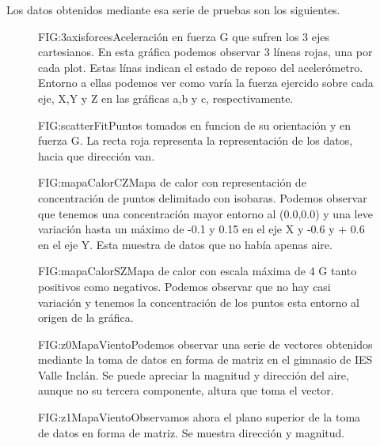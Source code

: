 
Los datos obtenidos mediante esa serie de pruebas son los siguientes.

\begin{figure}[Aceleraciones en 3 ejes.]{FIG:3axisforces}{Aceleración en fuerza G que sufren los 3 ejes cartesianos. En esta gráfica podemos observar 3 líneas rojas, una por cada plot. Estas línas indican el estado de reposo del acelerómetro. Entorno a ellas podemos ver como varía la fuerza ejercido sobre cada eje, X,Y y Z en las gráficas a,b y c, respectivamente.}
\end{figure}

\begin{figure}[Puntos de medida]{FIG:scatterFit}{Puntos tomados en funcion de su orientación y en fuerza G. La recta roja representa la representación de los datos, hacia que dirección van.}
\end{figure}

\begin{figure}[Mapa de calor con zoom]{FIG:mapaCalorCZ}{Mapa de calor con representación de concentración de puntos delimitado con isobaras. Podemos observar que tenemos una concentración mayor entorno al (0.0,0.0) y una leve variación hasta un máximo de -0.1 y 0.15 en el eje X y -0.6 y + 0.6 en el eje Y. Esta muestra de datos que no había apenas aire.}
\end{figure}

\begin{figure}[Mapa de calor sin zoom]{FIG:mapaCalorSZ}{Mapa de calor con escala máxima de 4 G tanto positivos como negativos. Podemos observar que no hay casi variación y tenemos la concentración de los puntos esta entorno al origen de la gráfica.}
\end{figure}

\begin{figure}[Mapa viento 2D - Z0]{FIG:z0MapaViento}{Podemos observar una serie de vectores obtenidos mediante la toma de datos en forma de matriz en el gimnasio de IES Valle Inclán. Se puede apreciar la magnitud y dirección del aire, aunque no su tercera componente, altura que toma el vector.}
\end{figure}


\begin{figure}[Mapa viento 2D - Z1]{FIG:z1MapaViento}{Observamos ahora el plano superior de la toma de datos en forma de matriz. Se muestra dirección y magnitud.}
\end{figure}

